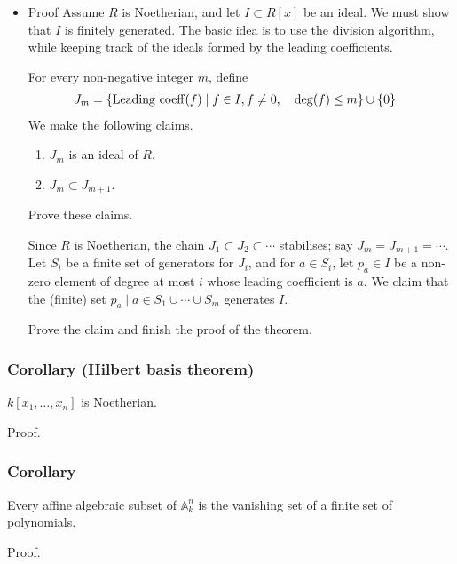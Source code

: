 \documentclass[11pt]{article}
\begin{document}
\begin{itemize}
\item Proof
\label{sec:org3c98d55}
Assume \(R\) is Noetherian, and let \(I \subset R[x]\) be an ideal.
We must show that \(I\) is finitely generated.
The basic idea is to use the division algorithm, while keeping track of the ideals formed by the leading coefficients.

For every non-negative integer \(m\), define
\begin{align*}
J_m &= \{{\rm Leading\ coeff} (f) \mid f \in I, f \neq 0, \quad \deg(f) \leq m\} \cup \{0\}
\end{align*}
We make the following claims.
\begin{enumerate}
\item \(J_m\) is an ideal of \(R\).
\item \(J_m \subset J_{m+1}\).
\end{enumerate}
\begin{skipped}
Prove these claims.
\end{skipped}
Since \(R\) is Noetherian, the chain \(J_1 \subset J_2 \subset \cdots\) stabilises; say \(J_m = J_{m+1} = \cdots\).
Let \(S_i\) be a finite set of generators for \(J_i\), and for \(a \in S_i\), let \(p_a \in I\) be a non-zero element of degree at most \(i\) whose leading coefficient is \(a\).
We claim that the (finite) set \(p_a \mid a \in S_1 \cup \cdots \cup S_m\) generates \(I\).    
\begin{skipped}
Prove the claim and finish the proof of the theorem.
\end{skipped}
\end{itemize}

\subsubsection{Corollary (Hilbert basis theorem)}
\label{sec:org5976baf}
\(k[x_1,\dots,x_n]\) is Noetherian.
\begin{skipped}
Proof.
\end{skipped}
\subsubsection{Corollary}
\label{sec:org0fc3344}
Every affine algebraic subset of \(\mathbb A^n_k\) is the vanishing set of a finite set of polynomials.

\begin{skipped}
Proof.
\end{skipped}
\end{document}

